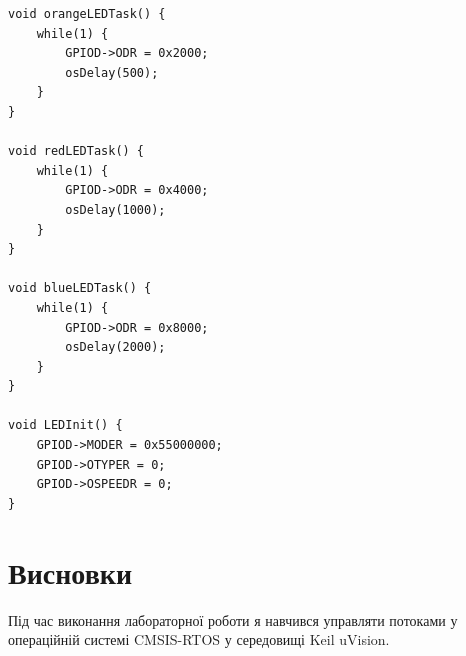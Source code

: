 \documentclass[oneside,14pt]{extarticle}
\begin{document}
\begin{normalsize}
{\begin{lstlisting}
void orangeLEDTask() {
	while(1) {
		GPIOD->ODR = 0x2000;
		osDelay(500);
	}
}

void redLEDTask() {
	while(1) {
		GPIOD->ODR = 0x4000;
		osDelay(1000);
	}
}

void blueLEDTask() {
	while(1) {
		GPIOD->ODR = 0x8000;
		osDelay(2000);
	}
}

void LEDInit() {
	GPIOD->MODER = 0x55000000;
	GPIOD->OTYPER = 0;
	GPIOD->OSPEEDR = 0;
}
		\end{lstlisting}
	}
	
	\section*{Висновки}
	Під час виконання лабораторної роботи я навчився управляти потоками у операційній системі CMSIS-RTOS у середовищі Keil uVision.
	    
\end{normalsize}
\end{document}
